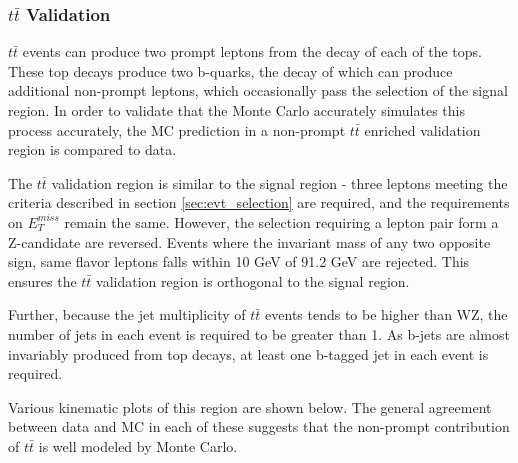 \subsubsection{$t\bar{t}$ Validation}

$t\bar{t}$ events can produce two prompt leptons from the decay of each of the tops. These top decays produce two b-quarks, the decay of which can produce additional non-prompt leptons, which occasionally pass the selection of the signal region. In order to validate that the Monte Carlo accurately simulates this process accurately, the MC prediction in a non-prompt $t\bar{t}$ enriched validation region is compared to data.

The $t\bar{t}$ validation region is similar to the signal region - three leptons meeting the criteria described in section \ref{sec:evt_selection} are required, and the requirements on $E_T^{miss}$ remain the same. However, the selection requiring a lepton pair form a Z-candidate are reversed. Events where the invariant mass of any two opposite sign, same flavor leptons falls within 10 GeV of 91.2 GeV are rejected. This ensures the $t\bar{t}$ validation region is orthogonal to the signal region. 

Further, because the jet multiplicity of $t\bar{t}$ events tends to be higher than WZ, the number of jets in each event is required to be greater than 1. As b-jets are almost invariably produced from top decays, at least one b-tagged jet in each event is required. 



Various kinematic plots of this region are shown below. The general agreement between data and MC in each of these suggests that the non-prompt contribution of $t\bar{t}$ is well modeled by Monte Carlo.

